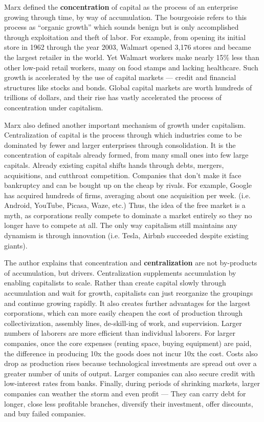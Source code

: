 Marx defined the \textbf{concentration} of capital as the process of an enterprise growing through time, by way of accumulation. The bourgeoisie refers to this process as “organic growth” which sounds benign but is only accomplished through exploitation and theft of labor. For example, from opening its initial store in 1962 through the year 2003, Walmart opened 3,176 stores and became the largest retailer in the world. Yet Walmart workers make nearly 15\% less than other low-paid retail workers, many on food stamps and lacking healthcare. Such growth is accelerated by the use of capital markets — credit and financial structures like stocks and bonds. Global capital markets are worth hundreds of trillions of dollars, and their rise has vastly accelerated the process of concentration under capitalism.

Marx also defined another important mechanism of growth under capitalism. Centralization of capital is the process through which industries come to be dominated by fewer and larger enterprises through consolidation. It is the concentration of capitals already formed, from many small ones into few large capitals. Already existing capital shifts hands through debts, mergers, acquisitions, and cutthroat competition. Companies that don’t make it face bankruptcy and can be bought up on the cheap by rivals. For example, Google has acquired hundreds of firms, averaging about one acquisition per week. (i.e. Android, YouTube, Picasa, Waze, etc.) Thus, the idea of the free market is a myth, as corporations really compete to dominate a market entirely so they no longer have to compete at all. The only way capitalism still maintains any dynamism is through innovation (i.e. Tesla, Airbnb succeeded despite existing giants).

The author explains that concentration and \textbf{centralization} are not by-products of accumulation, but drivers. Centralization supplements accumulation by enabling capitalists to scale. Rather than create capital slowly through accumulation and wait for growth, capitalists can just reorganize the groupings and continue growing rapidly. It also creates further advantages for the largest corporations, which can more easily cheapen the cost of production through collectivization, assembly lines, de-skill-ing of work, and supervision. Larger numbers of laborers are more efficient than individual laborers. For larger companies, once the core expenses (renting space, buying equipment) are paid, the difference in producing 10x the goods does not incur 10x the cost. Costs also drop as production rises because technological investments are spread out over a greater number of units of output. Larger companies can also secure credit with low-interest rates from banks. Finally, during periods of shrinking markets, larger companies can weather the storm and even profit — They can carry debt for longer, close less profitable branches, diversify their investment, offer discounts, and buy failed companies.

